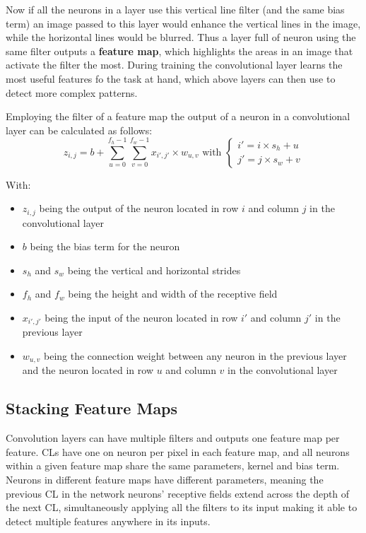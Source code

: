 \documentclass[12pt letter]{report}
\begin{document}
Now if all the neurons in a layer use this vertical line filter (and the
same bias term) an image passed to this layer would enhance the vertical
lines in the image, while the horizontal lines would be blurred. Thus a
layer full of neuron using the same filter outputs a \textbf{feature
map}, which highlights the areas in an image that activate the filter
the most. During training the convolutional layer learns the most useful
features fo the task at hand, which above layers can then use to detect
more complex patterns.

Employing the filter of a feature map the output of a neuron in a
convolutional layer can be calculated as follows: \[
z_{i, j} = b + \displaystyle\sum_{u=0}^{f_h-1} \displaystyle\sum_{v=0}^{f_w-1} x_{i', j'} \times w_{u, v} \text{ with } \begin{cases}
i' = i \times s_h + u \\
j' = j \times s_w + v
\end{cases}
\]

With:

\begin{itemize}
\item
  \(z_{i,j}\) being the output of the neuron located in row \(i\) and
  column \(j\) in the convolutional layer
\item
  \(b\) being the bias term for the neuron
\item
  \(s_h\) and \(s_w\) being the vertical and horizontal strides
\item
  \(f_h\) and \(f_w\) being the height and width of the receptive field
\item
  \(x_{i', j'}\) being the input of the neuron located in row \(i'\) and
  column \(j'\) in the previous layer
\item
  \(w_{u,v}\) being the connection weight between any neuron in the
  previous layer and the neuron located in row \(u\) and column \(v\) in
  the convolutional layer
\end{itemize}

\subsection{Stacking Feature Maps}\label{stacking-feature-maps}

Convolution layers can have multiple filters and outputs one feature map
per feature. CLs have one on neuron per pixel in each feature map, and
all neurons within a given feature map share the same parameters, kernel
and bias term. Neurons in different feature maps have different
parameters, meaning the previous CL in the network neurons' receptive
fields extend across the depth of the next CL, simultaneously applying
all the filters to its input making it able to detect multiple features
anywhere in its inputs.
\end{document}
